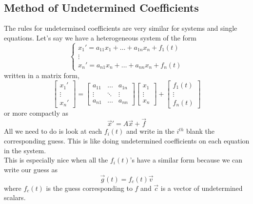 \subsection{Method of Undetermined Coefficients}
\noindent
The rules for undetermined coefficients are very similar for systems and single equations. Let's say we have a heterogeneous system of the form
\begin{equation*}
	\begin{cases}
		x_1' = a_{11}x_1 + \ldots + a_{1n}x_n + f_1(t) \\
		\vdots \\
		x_n' = a_{n1}x_n + \ldots + a_{nn}x_n + f_n(t)
	\end{cases}
\end{equation*}
written in a matrix form,
\begin{equation*}
	\begin{bmatrix}
		x_1' \\
		\vdots \\
		x_n'
	\end{bmatrix} = \begin{bmatrix}
		a_{11} & \ldots & a_{1n} \\
		\vdots & \ddots & \vdots \\
		a_{n1} & \ldots & a_{nn}
	\end{bmatrix} \begin{bmatrix}
		x_1 \\
		\vdots \\
		x_n
	\end{bmatrix} + \begin{bmatrix}
		f_1(t) \\
		\vdots \\
		f_n(t)
	\end{bmatrix}
\end{equation*}
or more compactly as
\begin{equation*}
	\vec{x}' = A\vec{x} + \vec{f}
\end{equation*}
All we need to do is look at each $f_i(t)$ and write in the $i^{th}$ blank the corresponding guess. This is like doing undetermined coefficients on each equation in the system.\\

\noindent
This is especially nice when all the $f_i(t)$'s have a similar form because we can write our guess as
\begin{equation*}
	\vec{g}(t) = f_c(t)\vec{v}
\end{equation*}
where $f_c(t)$ is the guess corresponding to $f$ and $\vec{c}$ is a vector of undetermined scalars.

\ifodd{}\fi